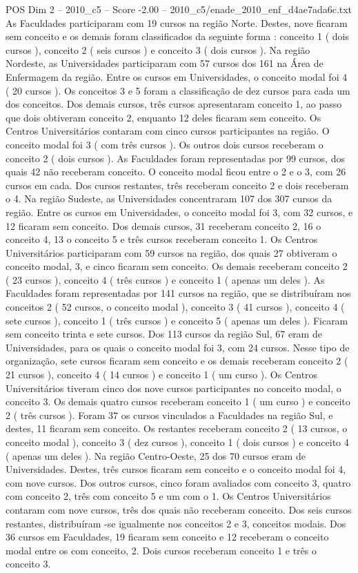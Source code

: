 \begin{textsample}{POS Dim 2 – 2010\_c5 – Score -2.00 – 2010\_c5/enade\_2010\_enf\_d4ae7ada6c.txt}
As Faculdades participaram com 19 cursos na região Norte.
Destes, nove ficaram sem conceito e os demais foram classificados da seguinte forma : conceito 1 ( dois cursos ), conceito 2 ( seis cursos ) e conceito 3 ( dois cursos ).
Na região Nordeste, as Universidades participaram com 57 cursos dos 161 na Área de Enfermagem da região.
Entre os cursos em Universidades, o conceito modal foi 4 ( 20 cursos ).
Os conceitos 3 e 5 foram a classificação de dez cursos para cada um dos conceitos.
Dos demais cursos, três cursos apresentaram conceito 1, ao passo que dois obtiveram conceito 2, enquanto 12 deles ficaram sem conceito.
Os Centros Universitários contaram com cinco cursos participantes na região.
O conceito modal foi 3 ( com três cursos ).
Os outros dois cursos receberam o conceito 2 ( dois cursos ).
As Faculdades foram representadas por 99 cursos, dos quais 42 não receberam conceito.
O conceito modal ficou entre o 2 e o 3, com 26 cursos em cada.
Dos cursos restantes, três receberam conceito 2 e dois receberam o 4.
Na região Sudeste, as Universidades concentraram 107 dos 307 cursos da região.
Entre os cursos em Universidades, o conceito modal foi 3, com 32 cursos, e 12 ficaram sem conceito.
Dos demais cursos, 31 receberam conceito 2, 16 o conceito 4, 13 o conceito 5 e três cursos receberam conceito 1.
Os Centros Universitários participaram com 59 cursos na região, dos quais 27 obtiveram o conceito modal, 3, e cinco ficaram sem conceito.
Os demais receberam conceito 2 ( 23 cursos ), conceito 4 ( três cursos ) e conceito 1 ( apenas um deles ).
As Faculdades foram representadas por 141 cursos na região, que se distribuíram nos conceitos 2 ( 52 cursos, o conceito modal ), conceito 3 ( 41 cursos ), conceito 4 ( sete cursos ), conceito 1 ( três cursos ) e conceito 5 ( apenas um deles ).
Ficaram sem conceito trinta e sete cursos.
Dos 113 cursos da região Sul, 67 eram de Universidades, para os quais o conceito modal foi 3, com 24 cursos.
Nesse tipo de organização, sete cursos ficaram sem conceito e os demais receberam conceito 2 ( 21 cursos ), conceito 4 ( 14 cursos ) e conceito 1 ( um curso ).
Os Centros Universitários tiveram cinco dos nove cursos participantes no conceito modal, o conceito 3.
Os demais quatro cursos receberam conceito 1 ( um curso ) e conceito 2 ( três cursos ).
Foram 37 os cursos vinculados a Faculdades na região Sul, e destes, 11 ficaram sem conceito.
Os restantes receberam conceito 2 ( 13 cursos, o conceito modal ), conceito 3 ( dez cursos ), conceito 1 ( dois cursos ) e conceito 4 ( apenas um deles ).
Na região Centro-Oeste, 25 dos 70 cursos eram de Universidades.
Destes, três cursos ficaram sem conceito e o conceito modal foi 4, com nove cursos.
Dos outros cursos, cinco foram avaliados com conceito 3, quatro com conceito 2, três com conceito 5 e um com o 1.
Os Centros Universitários contaram com nove cursos, três dos quais não receberam conceito.
Dos seis cursos restantes, distribuíram -se igualmente nos conceitos 2 e 3, conceitos modais.
Dos 36 cursos em Faculdades, 19 ficaram sem conceito e 12 receberam o conceito modal entre os com conceito, 2.
Dois cursos receberam conceito 1 e três o conceito 3.

\end{textsample}
